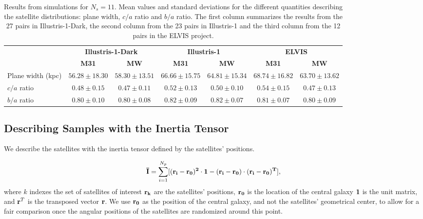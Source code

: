 \documentclass[a4paper,fleqn,usenatbib]{mnras}
\begin{document}
\begin{table}
  \centering
  \renewcommand{\arraystretch}{1.2}
  \begin{tabular}{|p{2.5cm}|c|c|c|c|c|c|}
    \hline
    \multirow{2}{4.0cm}{} & \multicolumn{2}{c|}{\textbf{Illustris-1-Dark}} & \multicolumn{2}{c|}{\textbf{Illustris-1}} & \multicolumn{2}{c|}{\textbf{ELVIS}}\\
    \cline{2-7}
    & \textbf{M31} & \textbf{MW} & \textbf{M31} & \textbf{MW}& \textbf{M31} & \textbf{MW}\\
    \hline
Plane width (kpc) & $56.28\pm 18.30$ & $58.30 \pm 13.51$  & $66.66\pm 15.75$ & $64.81\pm 15.34$ & $68.74\pm 16.82$ & $63.70\pm 13.62$\\\hline
$c/a$ ratio & $0.48\pm 0.15$ & $0.47 \pm 0.11$  & $0.52\pm 0.13$ & $0.50\pm 0.10$ & $0.54\pm 0.15$ & $0.47\pm 0.13$\\\hline
$b/a$ ratio & $0.80\pm 0.10$ & $0.80 \pm 0.08$  & $0.82\pm 0.09$ & $0.82\pm 0.07$ & $0.81\pm 0.07$ & $0.80\pm 0.09$\\\hline
  \end{tabular}
  \caption{Results from simulations for $N_s=11$. Mean values and standard deviations for the different
    quantities describing the satellite distributions: plane width, $c/a$
    ratio and $b/a$ ratio. 
    The first column summarizes the results from the 27 pairs in
    Illustris-1-Dark, the second column from the 23 pairs in
    Illustris-1 and the third column from the 12 pairs in the
    ELVIS project.\label{table:simulations}}
\end{table}



\subsection{Describing Samples with the Inertia Tensor}

We describe the satellites with the inertia
tensor defined by the satellites' positions.  

\begin{equation}
{\bf{\bar{I}}} = \sum_{i=1}^{N_p}[(\bf{r}_i - \bf{r}_0)^2\cdot \bf{1} -
  (\bf{r}_i-\bf{r}_0)\cdot (\bf{r}_i - \bf{r}_0)^{T}],
\label{eq:intensor}
\end{equation}
%
where $k$ indexes the set of satellites of interest
$\bf{r}_k$ are the satellites' positions, $\bf{r}_{0}$ is the location
of the central galaxy $\bf{1}$ is the unit matrix, and  
${\bf r}^T$ is the transposed vector $\bf{r}$. 
We use $\bf{r}_0$ as the position of the central galaxy, and not the
satellites' geometrical center, to allow for a fair comparison once
the angular positions of the satellites are randomized around this
point. 
\end{document}
